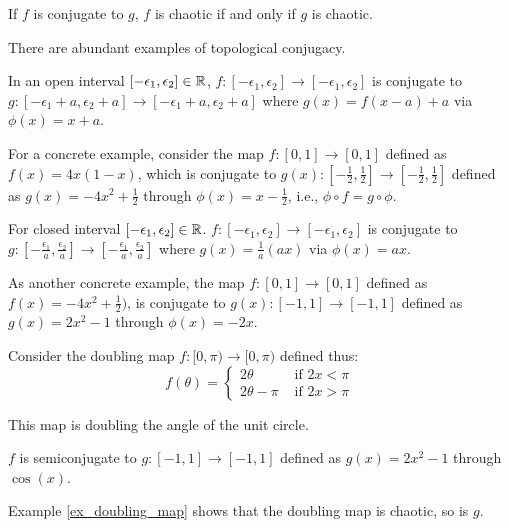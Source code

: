 \begin{prop}\label{prop_conj_chaos}
	If $f$ is conjugate to $g$, $f$ is chaotic if and only if $g$ is chaotic.
\end{prop}

There are abundant examples of topological conjugacy.

\begin{example}
	In an open interval $[-\epsilon_1, \epsilon_2] \in \mathbb{R}$,
	$f: [-\epsilon_1, \epsilon_2] \rightarrow [-\epsilon_1, \epsilon_2]$
	is conjugate to 
	$g: [-\epsilon_1 + a, \epsilon_2 + a] \rightarrow  [-\epsilon_1 + a, \epsilon_2 + a]$
	where $g(x)= f(x -a) + a$ via $\phi(x) = x + a$.

	For a concrete example, consider the map 
	$f: [0,1] \rightarrow [0,1]$
	defined as $f(x) = 4x(1-x)$,
	which is conjugate to 
	$g(x): [-\frac{1}{2}, \frac{1}{2}] \rightarrow [-\frac{1}{2}, \frac{1}{2}]$
	defined as $g(x) = -4x^2 + \frac{1}{2}$ 
	through $\phi(x) = x -\frac{1}{2}$, i.e., $ \phi \circ f=  g \circ \phi$.
\end{example}

\begin{example}
	For closed interval $[-\epsilon_1, \epsilon_2] \in \mathbb{R}$. 
	$f: [-\epsilon_1, \epsilon_2] \rightarrow [-\epsilon_1, \epsilon_2]$
	is conjugate to 
	$g: [-\frac{\epsilon_1}{a}, \frac{\epsilon_2}{a}] \rightarrow [-\frac{\epsilon_1}{a}, \frac{\epsilon_2}{a}]$
	where $g(x)= \frac{1}{a}(ax)$ via $\phi(x) = ax$.


	As another concrete example, the map $f: [0,1] \rightarrow [0,1]$
	defined as $f(x) = -4x^2 + \frac{1}{2})$,
	is conjugate to 
	$g(x): [-1, 1] \rightarrow [-1, 1]$
	defined as $g(x) = 2x^2 - 1$
	through $\phi(x) = -2x$.
\end{example}

\begin{example}
	Consider the doubling map $f: [0,\pi) \rightarrow [0, \pi)$ defined thus: 
	$$
	f(\theta) = 
		\begin{cases}
			2 \theta &\text{ if } 2x <  \pi \\
			2 \theta - \pi &\text{ if } 2x > \pi
		\end{cases}
	$$
	
	This map is doubling the angle of the unit circle.

	$f$ is semiconjugate to $g: [-1, 1] \rightarrow [-1, 1]$ defined as $g(x) = 2x^2 - 1$ through $\cos(x)$.

	Example \ref{ex_doubling_map} shows that the doubling map is chaotic, so is $g$.
\end{example}

